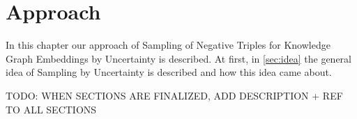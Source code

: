 \chapter{Approach}
\label{ch:approach}

In this chapter our approach of Sampling of Negative Triples for Knowledge Graph Embeddings by Uncertainty is described.
At first, in \autoref{sec:idea} the general idea of Sampling by Uncertainty is described and how this idea came about.

TODO: WHEN SECTIONS ARE FINALIZED, ADD DESCRIPTION + REF TO ALL SECTIONS






